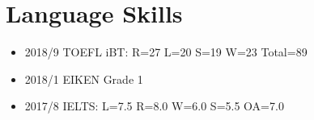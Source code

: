 \documentclass{article}
\begin{document}
\section*{Language Skills}
  \begin{itemize}
    \item 2018/9 TOEFL iBT: R=27 L=20 S=19 W=23 Total=89
    \item 2018/1 EIKEN Grade 1
    \item 2017/8 IELTS: L=7.5 R=8.0 W=6.0 S=5.5 OA=7.0
  \end{itemize}
\end{document}
